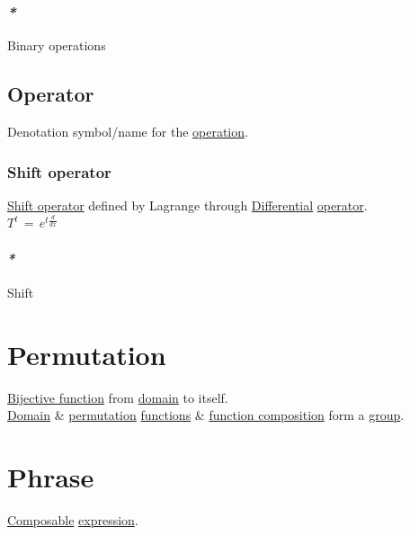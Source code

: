 \documentclass[a4paper,14pt,oneside]{book}
\begin{document}
\subsection{\emph{*}}
\label{sec:org86462ad}

\label{org126810a}Binary operations\\

\section{\label{org3447ed4}Operator}
\label{sec:orgf930051}
Denotation symbol/name for the \hyperref[org6ed0c27]{operation}.\\

\subsection{\label{org71cee43}Shift operator}
\label{sec:orgbc84ac1}
\hyperref[org71cee43]{Shift operator} defined by Lagrange through \hyperref[org586f81e]{Differential} \hyperref[org3447ed4]{operator}.\\
\(T^{t} \, = \, e^{t{\frac{d}{dx}}}\)\\

\subsubsection{\emph{*}}
\label{sec:orgad5269a}

Shift\\

\chapter{\label{org1557763}Permutation}
\label{sec:org5b3b9bd}
\hyperref[org224d5f8]{Bijective function} from \hyperref[orgeb6ec49]{domain} to itself.\\

\hyperref[orgeb6ec49]{Domain} \& \hyperref[org1557763]{permutation} \hyperref[org0bd6046]{functions} \& \hyperref[org822e273]{function composition} form a \hyperref[org14a82b6]{group}.\\

\chapter{\label{orgfdf9ccc}Phrase}
\label{sec:org5026a61}
\hyperref[org51db08c]{Composable} \hyperref[org6aa6989]{expression}.\\
\end{document}

